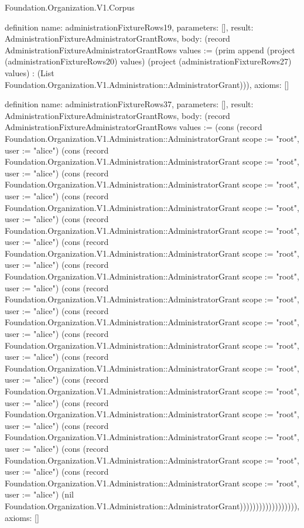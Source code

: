 \begin{lexlean}{Foundation.Organization.V1.Corpus}
\begin{semanticmodule}
definition{
  name: administrationFixtureRows19,
  parameters: [],
  result: AdministrationFixtureAdministratorGrantRows,
  body: (record AdministrationFixtureAdministratorGrantRows {values := (prim append (project (administrationFixtureRows20) values) (project (administrationFixtureRows27) values) : (List Foundation.Organization.V1.Administration::AdministratorGrant))}),
  axioms: []
}

definition{
  name: administrationFixtureRows37,
  parameters: [],
  result: AdministrationFixtureAdministratorGrantRows,
  body: (record AdministrationFixtureAdministratorGrantRows {values := (cons (record Foundation.Organization.V1.Administration::AdministratorGrant {scope := "root", user := "alice"}) (cons (record Foundation.Organization.V1.Administration::AdministratorGrant {scope := "root", user := "alice"}) (cons (record Foundation.Organization.V1.Administration::AdministratorGrant {scope := "root", user := "alice"}) (cons (record Foundation.Organization.V1.Administration::AdministratorGrant {scope := "root", user := "alice"}) (cons (record Foundation.Organization.V1.Administration::AdministratorGrant {scope := "root", user := "alice"}) (cons (record Foundation.Organization.V1.Administration::AdministratorGrant {scope := "root", user := "alice"}) (cons (record Foundation.Organization.V1.Administration::AdministratorGrant {scope := "root", user := "alice"}) (cons (record Foundation.Organization.V1.Administration::AdministratorGrant {scope := "root", user := "alice"}) (cons (record Foundation.Organization.V1.Administration::AdministratorGrant {scope := "root", user := "alice"}) (cons (record Foundation.Organization.V1.Administration::AdministratorGrant {scope := "root", user := "alice"}) (cons (record Foundation.Organization.V1.Administration::AdministratorGrant {scope := "root", user := "alice"}) (cons (record Foundation.Organization.V1.Administration::AdministratorGrant {scope := "root", user := "alice"}) (cons (record Foundation.Organization.V1.Administration::AdministratorGrant {scope := "root", user := "alice"}) (cons (record Foundation.Organization.V1.Administration::AdministratorGrant {scope := "root", user := "alice"}) (cons (record Foundation.Organization.V1.Administration::AdministratorGrant {scope := "root", user := "alice"}) (cons (record Foundation.Organization.V1.Administration::AdministratorGrant {scope := "root", user := "alice"}) (nil Foundation.Organization.V1.Administration::AdministratorGrant)))))))))))))))))}),
  axioms: []
}


\end{semanticmodule}
\end{lexlean}
